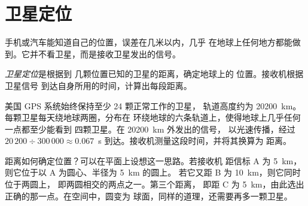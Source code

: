 \section{卫星定位}

手机或汽车能知道自己的位置，误差在几米以内，几乎
在地球上任何地方都能做到。它并不看卫星，而是接收卫星发出的信号。

\begin{definition}[卫星定位]\label{def:g9:maps-of-the-earth:positioning}
\emph{卫星定位}是根据到
几颗位置已知的卫星的距离，确定地球上的
位置。接收机根据卫星信号
到达自身所用的时间，计算出每段距离。
\end{definition}

美国 GPS 系统始终保持至少 24 颗正常工作的卫星，
轨道高度约为 \qty{20200}{km}。每颗卫星每天绕地球两圈，分布在
环绕地球的六条轨道上，使得地球上几乎任何一点都至少能看到
四颗卫星。在 \qty{20200}{km} 外发出的信号，
以光速传播，经过 $20\,200 \div
300\,000 \approx 0.067$~s 到达。接收机测量这段时间，并将其换算为
距离。

距离如何确定位置？可以在平面上设想这一思路。若接收机
距信标 A 为 \qty{5}{km}，则它位于以 A 为圆心、半径为 \qty{5}{km} 的圆上。
若它又距 B 为 \qty{10}{km}，则它同时位于两圆上，
即两圆相交的两点之一。第三个距离，
即距 C 为 \qty{5}{km}，由此选出正确的那一点。在空间中，圆变为
球面，同样的道理，还需要再多一颗卫星。

